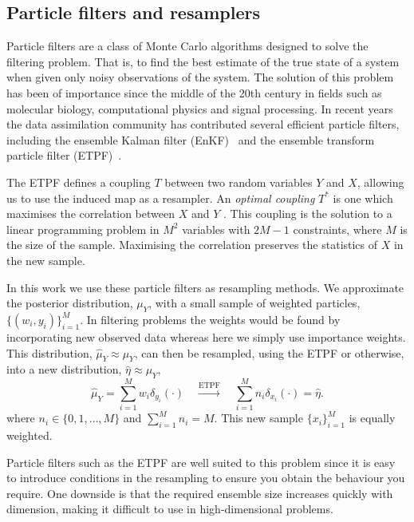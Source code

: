 \documentclass[final]{siamltex}
\begin{document}

\subsection{Particle filters and resamplers}\label{sec:filters}

Particle filters are a class of Monte Carlo algorithms designed to
solve the filtering problem. That is, to find the best estimate of the
true state of a system when given only noisy observations of the
system. The solution of this problem has been of importance since the
middle of the 20th century in fields such as molecular biology,
computational physics and signal processing. In recent years the data
assimilation community has contributed several efficient particle
filters, including the ensemble Kalman filter
(EnKF)~\cite{evensen1994sequential} and the ensemble transform
particle filter (ETPF)~\cite{reich2013nonparametric}.

The ETPF defines a coupling $T$ between two random variables $Y$ and
$X$, allowing us to use the induced map as a resampler. An \emph{optimal
coupling} $T^*$ is one which maximises the correlation between $X$ and
$Y$ \cite{cotter2012ensemble}. This coupling is the solution to a
linear programming problem in $M^2$ variables with $2M-1$ constraints,
where $M$ is the size of the sample. Maximising the correlation
preserves the statistics of $X$ in the new sample.

In this work we use these particle filters as resampling methods. We
approximate the posterior distribution, $\mu_Y$, with a small sample
of weighted particles, $\{(w_i,y_i)\}_{i=1}^M$. In filtering problems
the weights would be found by incorporating new observed data whereas
here we simply use importance weights. This distribution, $\hat{\mu}_Y
\approx \mu_Y$, can then be resampled, using the ETPF or otherwise,
into a new distribution, $\hat{\eta} \approx \mu_Y$,
\begin{equation}\label{eqn:resampler}
	\hat{\mu}_Y = \sum\limits_{i=1}^M \! w_i\delta_{y_i}(\cdot)
	 \quad \xrightarrow{\text{ETPF}} \quad \sum\limits_{i=1}^M \!
	 n_i\delta_{x_i}(\cdot) = \hat{\eta}.
\end{equation}
where $n_i \in \{0, 1, \dots,M\}$ and $\sum_{i=1}^M \! n_i = M$. This
new sample $\{x_i\}_{i=1}^M$ is equally weighted.

Particle filters such as the ETPF are well suited to this problem
since it is easy to introduce conditions in the resampling to ensure
you obtain the behaviour you require. One downside is that the
required ensemble size increases quickly with dimension, making it
difficult to use in high-dimensional problems.
\end{document}
